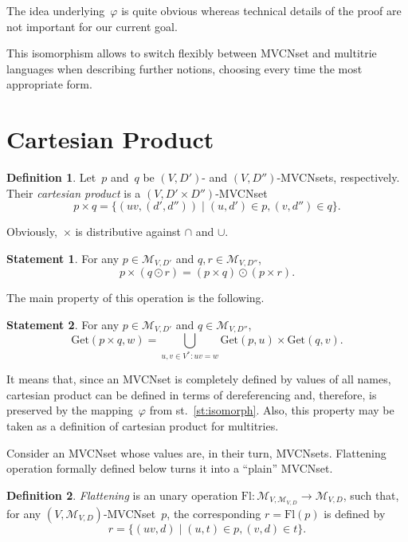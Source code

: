 \documentclass{article}
\theoremstyle{definition}
\newtheorem{Df}{Definition}
\newtheorem{St}{Statement}
\newcommand{\setcharmvcn}{M}
\newcommand{\setsymbol}[3]{\mathcal{#1}_{#2,#3}}
\newcommand{\setmvcn}[2]{\setsymbol{\setcharmvcn}{#1}{#2}}
\newcommand{\flatten}{\mathrm{Fl}}
\newcommand{\derefsymbol}{\mathrm{Get}}
\newcommand{\deref}[2]{\derefsymbol(#1, #2)}
\begin{document}
The idea underlying~$\varphi$ is quite obvious whereas technical details of the
proof are not important for our current goal.

This isomorphism allows to switch flexibly between MVCNset and multitrie
languages when describing further notions, choosing every time the most
appropriate form.


\section{Cartesian Product}

\begin{Df}\label{df:mvcn-cartesian}
Let~$p$ and~$q$ be $(V,D')$- and $(V,D'')$-MVCNsets, respectively. Their
\emph{cartesian product} is a $(V,D'\times D'')$-MVCNset
\[
  p\times q = \{ (uv, (d',d'')) \mid (u,d')\in p, (v,d'')\in q \} .
\]
\end{Df}

Obviously,~$\times$ is distributive against $\cap$ and $\cup$.
\begin{St}\label{st:cartesian-distributivity}
For any $p \in \setmvcn{V}{D'}$ and $q, r \in \setmvcn{V}{D''}$,
\[
  p\times(q\odot r) = (p\times q) \odot (p\times r) .
\]
\end{St}

The main property of this operation is the following.
\begin{St}\label{st:deref-cartesian}
For any $p \in \setmvcn{V}{D'}$ and $q \in \setmvcn{V}{D''}$,
\[
  \deref{p \times q}{w} =
      \bigcup_{u,v\in V^\ast: uv = w}
          \deref{p}{u}
          \times
          \deref{q}{v} .
\]
\end{St}
It means that, since an MVCNset is completely defined by values of all names,
cartesian product can be defined in terms of dereferencing and, therefore,
is preserved by the mapping~$\varphi$ from st.~\ref{st:isomorph}. Also, this
property may be taken as a definition of cartesian product for multitries.

Consider an MVCNset whose values are, in their turn, MVCNsets.
Flattening operation formally defined below turns it into a ``plain'' MVCNset.
\begin{Df}\label{df:flatten}
\emph{Flattening} is an unary operation
$\flatten : \setmvcn{V}{\setmvcn{V}{D}} \to\setmvcn{V}{D}$,
such that, for any $(V,\setmvcn{V}{D})$-MVCNset~$p$, the
corresponding $r=\flatten(p)$ is defined by
\[
  r = \{ (uv, d) \mid (u, t) \in p, (v, d) \in t \} .
\]
\end{Df}
\end{document}
